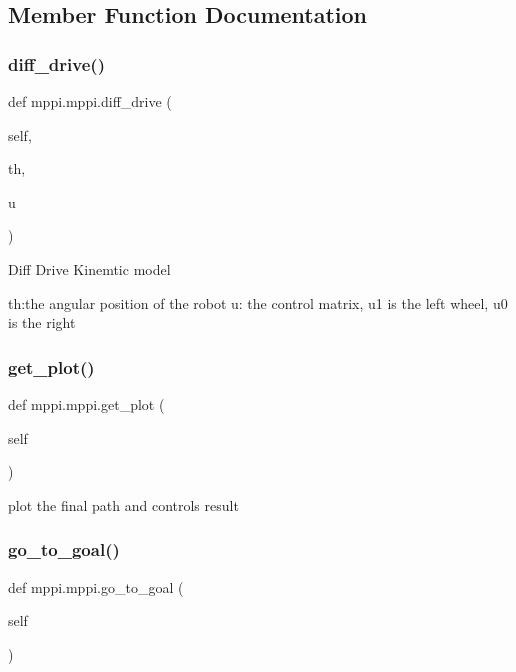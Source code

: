 \subsection{Member Function Documentation}
\mbox{\label{classmppi_1_1mppi_a15f30c6bfee7ffcd317c609858e28872}} 
\subsubsection{\texorpdfstring{diff\+\_\+drive()}{diff\_drive()}}
{\footnotesize\ttfamily def mppi.\+mppi.\+diff\+\_\+drive (\begin{DoxyParamCaption}\item[{}]{self,  }\item[{}]{th,  }\item[{}]{u }\end{DoxyParamCaption})}

\begin{DoxyVerb}Diff Drive Kinemtic model

th:the angular position of the robot
u: the control matrix, u1 is the left wheel, u0 is the right\end{DoxyVerb}
 \mbox{\label{classmppi_1_1mppi_ac7537cf9afe61a1fd82b820439893e67}} 
\subsubsection{\texorpdfstring{get\+\_\+plot()}{get\_plot()}}
{\footnotesize\ttfamily def mppi.\+mppi.\+get\+\_\+plot (\begin{DoxyParamCaption}\item[{}]{self }\end{DoxyParamCaption})}

\begin{DoxyVerb}plot the final path and controls result
\end{DoxyVerb}
 \mbox{\label{classmppi_1_1mppi_ae61896acd71b74fd6031675e5a810115}} 
\subsubsection{\texorpdfstring{go\+\_\+to\+\_\+goal()}{go\_to\_goal()}}
{\footnotesize\ttfamily def mppi.\+mppi.\+go\+\_\+to\+\_\+goal (\begin{DoxyParamCaption}\item[{}]{self }\end{DoxyParamCaption})}

